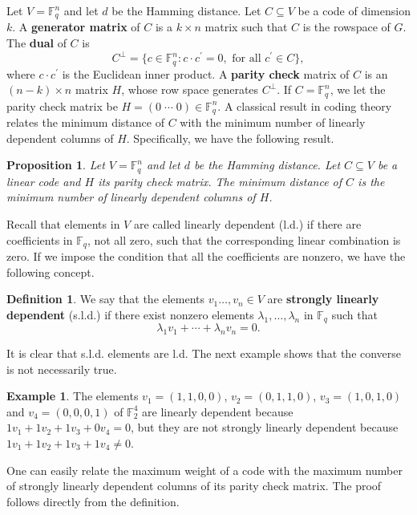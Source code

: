 \documentclass[12pt]{amsart}
\numberwithin{equation}{section}
\newtheorem{proposition}[theorem]{Proposition}
\theoremstyle{definition}
\newtheorem{definition}[theorem]{Definition}
\newtheorem{example}[theorem]{Example}
\newcommand{\FF}{\mathbb{F}}
\begin{document}
Let $V=\FF_q^n$ and let $d$ be the Hamming distance. Let $C \subseteq V$ be a code of dimension $k$. A {\bf generator matrix} of $C$ is a $k \times n$ matrix such that $C$ is the rowspace of $G$. The {\bf dual} of $C$ is 
\[ C^\perp = \{ c \in \FF_q^{n} : c \cdot c^\prime = 0, \textrm{ for all } c^\prime \in C \},\]
where $c \cdot c^\prime$ is the Euclidean inner product. A {\bf parity check} matrix of $C$ is an $(n-k)\times n$ matrix $H$, whose row space generates $C^{\perp}$. If $C = \FF_q^n$, we let the parity check matrix be $H=\left( 0\; \cdots\; 0 \right) \in \FF_q^n$. A classical result in coding theory relates the minimum distance of $C$ with the minimum number of linearly dependent columns of $H$. Specifically, we have the following result.

\begin{proposition}\cite[Corollary 1.4.14]{HP03}\label{25.02.26}
Let $V=\FF_q^n$ and let $d$ be the Hamming distance. Let $C \subseteq V$ be a linear code and $H$ its parity check matrix. The minimum distance of $C$ is the minimum number of linearly dependent columns of $H$.
\end{proposition}

Recall that elements in $V$ are called linearly dependent (l.d.) if there are coefficients in $\FF_q$, not all zero, such that the corresponding linear combination is zero. If we impose the condition that all the coefficients are nonzero, we have the following concept.

\begin{definition}\label{25.02.29}
We say that the elements $v_1\ldots,v_n \in V$ are {\bf strongly linearly dependent} (s.l.d.) if there exist nonzero elements $\lambda_1,\ldots,\lambda_n$ in $\FF_q$ such that
\[\lambda_1 v_1 + \cdots + \lambda_n v_n = 0.\]
\end{definition}
It is clear that s.l.d. elements are l.d. The next example shows that the converse is not necessarily true.

\begin{example}
The elements $v_1=(1,1,0,0)$, $v_2=(0,1,1,0)$, $v_3=(1,0,1,0)$ and $v_4=(0,0,0,1)$ of $\FF_2^4$ are linearly dependent because $1v_1+1v_2+1v_3+0v_4=0$, but they are not strongly linearly dependent because $1v_1+1v_2+1v_3+1v_4 \neq 0$.
\end{example}

One can easily relate the maximum weight of a code with the maximum number of strongly linearly dependent columns of its parity check matrix. The proof follows directly from the definition.
\end{document}
